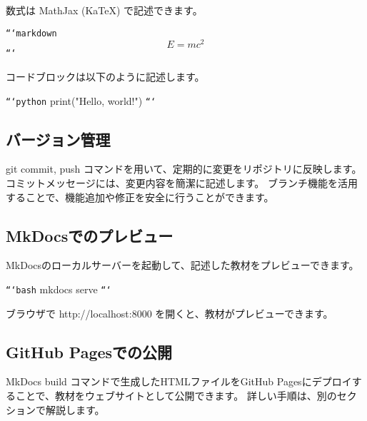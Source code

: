 数式は MathJax (KaTeX)  で記述できます。

\texttt{```markdown}
$$
E = mc^2
$$
\texttt{```}

コードブロックは以下のように記述します。

\texttt{```python}
print("Hello, world!")
\texttt{```}

\subsection{バージョン管理}
git commit, push コマンドを用いて、定期的に変更をリポジトリに反映します。
コミットメッセージには、変更内容を簡潔に記述します。
ブランチ機能を活用することで、機能追加や修正を安全に行うことができます。

\subsection{MkDocsでのプレビュー}
MkDocsのローカルサーバーを起動して、記述した教材をプレビューできます。

\texttt{```bash}
mkdocs serve
\texttt{```}

ブラウザで http://localhost:8000 を開くと、教材がプレビューできます。

\subsection{GitHub Pagesでの公開}
MkDocs build コマンドで生成したHTMLファイルをGitHub Pagesにデプロイすることで、教材をウェブサイトとして公開できます。
詳しい手順は、別のセクションで解説します。
